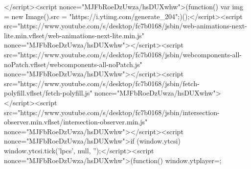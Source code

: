 </script><script nonce="MJFbRoeDzUwza/hsDUXwhw">(function() {var img = new Image().src = "https://i.ytimg.com/generate_204";})();</script><script src="https://www.youtube.com/s/desktop/fc7b0168/jsbin/web-animations-next-lite.min.vflset/web-animations-next-lite.min.js" nonce="MJFbRoeDzUwza/hsDUXwhw"></script><script src="https://www.youtube.com/s/desktop/fc7b0168/jsbin/webcomponents-all-noPatch.vflset/webcomponents-all-noPatch.js" nonce="MJFbRoeDzUwza/hsDUXwhw"></script><script src="https://www.youtube.com/s/desktop/fc7b0168/jsbin/fetch-polyfill.vflset/fetch-polyfill.js" nonce="MJFbRoeDzUwza/hsDUXwhw"></script><script src="https://www.youtube.com/s/desktop/fc7b0168/jsbin/intersection-observer.min.vflset/intersection-observer.min.js" nonce="MJFbRoeDzUwza/hsDUXwhw"></script><script nonce="MJFbRoeDzUwza/hsDUXwhw">if (window.ytcsi) {window.ytcsi.tick('lpcs', null, '');}</script><script nonce="MJFbRoeDzUwza/hsDUXwhw">(function() {window.ytplayer={};
}

